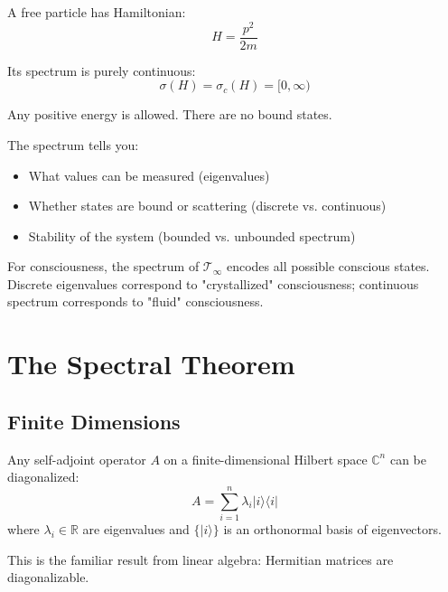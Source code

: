 \begin{example}\label{ex:free-particle-spectrum}
A free particle has Hamiltonian:
\begin{equation}
H = \frac{p^2}{2m}
\end{equation}

Its spectrum is purely continuous:
\begin{equation}
\sigma(H) = \sigma_c(H) = [0, \infty)
\end{equation}

Any positive energy is allowed. There are no bound states.
\end{example}

\begin{keyidea}
The spectrum tells you:
\begin{itemize}
\item What values can be measured (eigenvalues)
\item Whether states are bound or scattering (discrete vs. continuous)
\item Stability of the system (bounded vs. unbounded spectrum)
\end{itemize}

For consciousness, the spectrum of $\mathcal{T}_\infty$ encodes all possible conscious states. Discrete eigenvalues correspond to "crystallized" consciousness; continuous spectrum corresponds to "fluid" consciousness.
\end{keyidea}

\section{The Spectral Theorem}

\subsection{Finite Dimensions}

\begin{theorem}\label{thm:spectral-theorem-finite}
Any self-adjoint operator $A$ on a finite-dimensional Hilbert space $\mathbb{C}^n$ can be diagonalized:
\begin{equation}
A = \sum_{i=1}^n \lambda_i |i\rangle\langle i|
\end{equation}
where $\lambda_i \in \mathbb{R}$ are eigenvalues and $\{ |i\rangle \}$ is an orthonormal basis of eigenvectors.
\end{theorem}

This is the familiar result from linear algebra: Hermitian matrices are diagonalizable.

